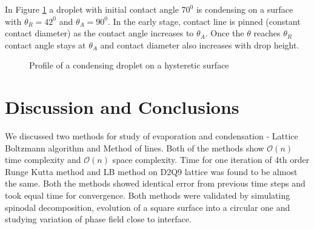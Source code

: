 \documentclass[11pt]{article}
\begin{document}
\par
In Figure \ref*{fig:condn_cah} a droplet with initial contact angle $70^{0}$ is condensing on a surface with $\theta_{R} = 42^{0}$ and $\theta_{A} = 90^{0}$. In the early stage, contact line is pinned (constant contact diameter) as the contact angle increases to $\theta_{A}$. Once the $\theta$ reaches $\theta_{R}$ contact angle stays at $\theta_{A}$ and contact diameter also increases with drop height. 
\begin{figure}[h!]
	\begin{center}
		\caption{Profile of a condensing droplet on a hysteretic surface }
		\label{fig:condn_cah}
	\end{center}
	
\end{figure}

\section{Discussion and Conclusions}

\par
We discussed two methods for study of evaporation and condensation - Lattice Boltzmann algorithm and Method of lines. Both of the methods show $\mathcal{O}(n)$ time complexity and $\mathcal{O}(n)$ space complexity. Time for one iteration of 4th order Runge Kutta method and LB method on D2Q9 lattice was found to be almost the same. Both the methods showed identical error from previous time steps and took equal time for convergence. Both methods were validated by simulating spinodal decomposition, evolution of a square surface into a circular one and studying variation of phase field close to interface. 
\end{document}
